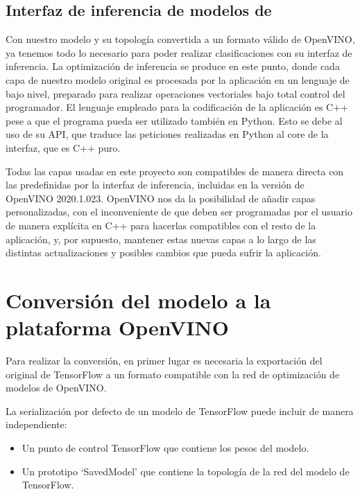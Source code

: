 \subsection{Interfaz de inferencia de modelos de }
\label{subsec:interfaz-de-infernecia-de-modelos-de-deep-learning}
Con nuestro modelo y su topología convertida a un formato válido de OpenVINO, ya tenemos todo lo necesario para poder realizar clasificaciones con su interfaz de inferencia\@.
La optimización de inferencia se produce en este punto, donde cada capa de nuestro modelo original es procesada por la aplicación en un lenguaje de bajo nivel, preparado para realizar operaciones vectoriales bajo total control del programador.
El lenguaje empleado para la codificación de la aplicación es C++ pese a que el programa pueda ser utilizado también en Python.
Esto se debe al uso de su API, que traduce las peticiones realizadas en Python al core de la interfaz, que es C++ puro.

Todas las capas usadas en este proyecto son compatibles de manera directa con las predefinidas por la interfaz de inferencia, incluidas en la versión de OpenVINO 2020.1.023.
OpenVINO nos da la posibilidad de añadir capas personalizadas, con el inconveniente de que deben ser programadas por el usuario de manera explícita en C++ para hacerlas compatibles con el resto de la aplicación, y, por supuesto, mantener estas nuevas capas a lo largo de las distintas actualizaciones y posibles cambios que pueda sufrir la aplicación.


\section{Conversión del modelo a la plataforma OpenVINO}\label{sec:conversión-del-modelo-a-la-plataforma-OpenVINO}
Para realizar la conversión, en primer lugar es necesaria la exportación del original de TensorFlow a un formato compatible con la red de optimización de modelos de OpenVINO\@.

La serialización por defecto de un modelo de TensorFlow puede incluir de manera independiente:

\begin{itemize}
    \item Un punto de control TensorFlow que contiene los pesos del modelo.
    \item Un prototipo `SavedModel' que contiene la topología de la red del modelo de TensorFlow.
\end{itemize}


